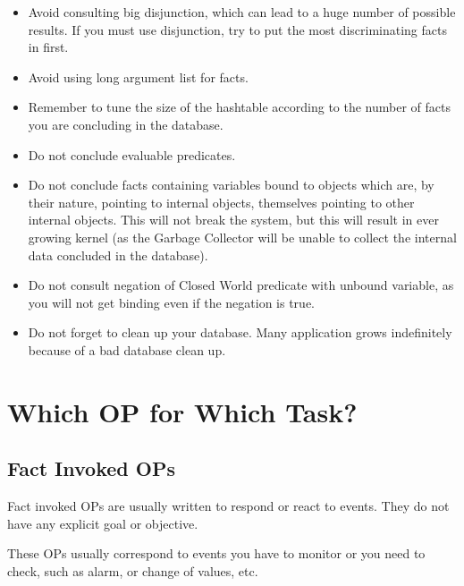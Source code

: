 \begin{itemize}

\item Avoid consulting big disjunction, which can lead to a huge number
of possible results. If you must use disjunction, try to put the most
discriminating facts in first.

\item Avoid using long argument list for facts.

\item Remember to tune the size of the hashtable according to the number
of facts you are concluding in the database.

\item Do not conclude evaluable predicates.

\item Do not conclude facts containing variables bound to objects which
are, by their nature, pointing to internal objects, themselves pointing
to other internal objects. This will not break the system, but this will
result in ever growing kernel (as the Garbage Collector will be unable to
collect the internal data concluded in the database).

\item Do not consult negation of Closed World predicate with unbound
variable, as you will not get binding even if the negation is true.

\item Do not forget to clean up your database. Many application grows
indefinitely because of a bad database clean up.

\end{itemize}

\section{Which OP for Which Task?}



\subsection{Fact Invoked OPs}

Fact invoked OPs are usually written to respond or react to events. They do not
have any explicit goal or objective.

These OPs usually correspond to events you have to monitor or you need to
check, such as alarm, or change of values, etc.

